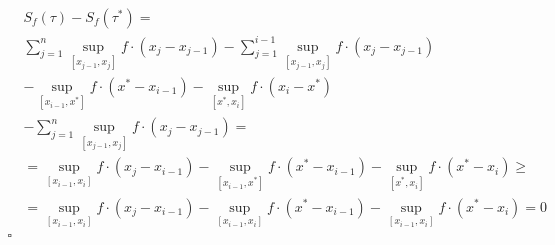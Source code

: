 \documentclass{article}
\begin{document}
    \begin{equation*}
        \begin{split}
                & S_f(\tau)-S_f(\tau^*) = \\
                & \sum_{j=1}^{n}\sup_{[x_{j-1},x_j]}f \cdot (x_j-x_{j-1}) -
                \sum_{j=1}^{i-1}\sup_{[x_{j-1},x_j]}f \cdot (x_j-x_{j-1}) \\
                & - \sup_{[x_{i-1},x^*]}f \cdot (x^*-x_{i-1}) -
                \sup_{[x^*,x_i]}f \cdot (x_i-x^*) \\
                & - \sum_{j=1}^{n}\sup_{[x_{j-1},x_j]}f \cdot (x_j-x_{j-1}) =\\
                & = 
                \sup_{[x_{i-1},x_i]}f \cdot (x_j-x_{i-1})
                - \sup_{[x_{i-1}, x^*]}f \cdot (x^*-x_{i-1}) 
                - \sup_{[x^*,x_i]}f \cdot (x^*-x_i) \ge \\
                & = 
                \sup_{[x_{i-1},x_i]}f \cdot (x_j-x_{i-1})
                - \sup_{[x_{i-1}, x_i]}f \cdot (x^*-x_{i-1}) 
                - \sup_{[x_{i-1},x_i]}f \cdot (x^*-x_i) = 0 \\
                \square
        \end{split}
    \end{equation*}
\end{document}
